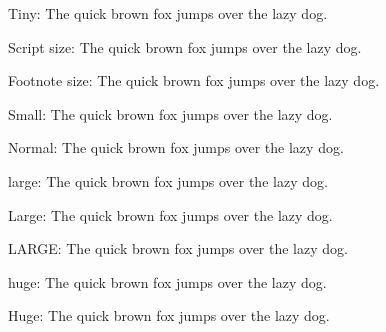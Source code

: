 {\tiny Tiny: The quick brown fox jumps over the lazy dog.}

{\scriptsize Script size: The quick brown fox jumps over the lazy dog.}

{\footnotesize Footnote size: The quick brown fox jumps over the lazy dog.}

{\small Small: The quick brown fox jumps over the lazy dog.}

{\normalsize Normal: The quick brown fox jumps over the lazy dog.}

{\large large: The quick brown fox jumps over the lazy dog.}

{\Large Large: The quick brown fox jumps over the lazy dog.}

{\LARGE LARGE: The quick brown fox jumps over the lazy dog.}

{\huge huge: The quick brown fox jumps over the lazy dog.}

{\Huge Huge: The quick brown fox jumps over the lazy dog.}

\rmfamily
